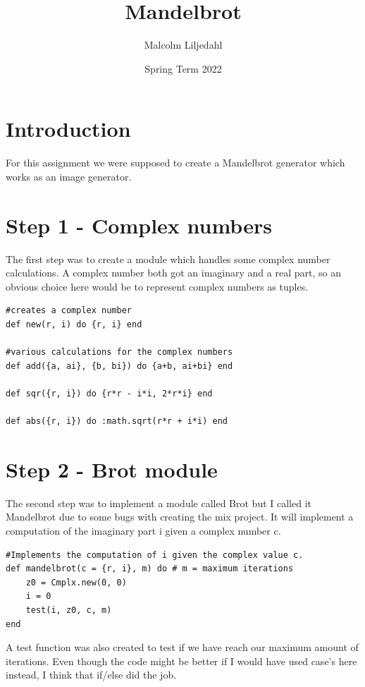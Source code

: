 \documentclass[a4paper,11pt]{article}
\begin{document}
\title{
    \textbf{Mandelbrot}
}
\author{Malcolm Liljedahl}
\date{Spring Term 2022}

\maketitle

\section*{Introduction}
For this assignment we were supposed to create a Mandelbrot generator which works as an image generator.

\section{Step 1 - Complex numbers}
The first step was to create a module which handles some complex number calculations. A complex number both got an imaginary and a real part, so an obvious choice here would be to represent complex numbers as tuples.

\begin{verbatim}
#creates a complex number
def new(r, i) do {r, i} end

#various calculations for the complex numbers
def add({a, ai}, {b, bi}) do {a+b, ai+bi} end

def sqr({r, i}) do {r*r - i*i, 2*r*i} end

def abs({r, i}) do :math.sqrt(r*r + i*i) end
\end{verbatim}


\section{Step 2 - Brot module}
The second step was to implement a module called Brot but I called it Mandelbrot due to some bugs with creating the mix project. It will implement a computation of the imaginary part i given a complex number c.

\begin{verbatim}
#Implements the computation of i given the complex value c.
def mandelbrot(c = {r, i}, m) do # m = maximum iterations
    z0 = Cmplx.new(0, 0)
    i = 0
    test(i, z0, c, m)
end
\end{verbatim}
A test function was also created to test if we have reach our maximum amount of iterations. Even though the code might be better if I would have used case's here instead, I think that if/else did the job. 
\end{document}
